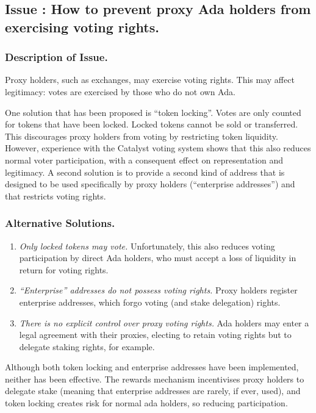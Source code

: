 \subsection*{Issue \theissue{}: How to prevent proxy Ada holders from exercising voting rights.}

\subsubsection*{Description of Issue.}

Proxy holders, such as exchanges, may exercise voting rights.  This may affect legitimacy: votes are exercised by those who do not own Ada.

One solution that has been proposed is ``token locking''.  Votes are
only counted for tokens that have been locked.  Locked tokens cannot
be sold or transferred.  This discourages proxy holders from voting by
restricting token liquidity.  However, experience with the Catalyst
voting system shows that this also reduces normal voter participation,
with a consequent effect on representation and
legitimacy. 
A second solution is to provide a second kind of address that is designed to be used specifically by proxy holders (``enterprise addresses'')
and that restricts voting rights.

\subsubsection*{Alternative Solutions.}

\begin{enumerate}
\item
  \emph{Only locked tokens may vote.}  Unfortunately, this also reduces voting participation by direct Ada holders, who must accept a loss of liquidity in return for voting rights.
\item
  \emph{``Enterprise'' addresses do not possess voting rights.}  Proxy holders register enterprise addresses, which forgo voting (and stake delegation) rights.
\item
  \emph{There is no explicit control over proxy voting rights.}  Ada holders may enter a legal agreement with their proxies, electing to retain voting
  rights but to delegate staking rights, for example.  
\end{enumerate}

Although both token locking and enterprise addresses have been implemented, neither has been effective.
The rewards mechanism incentivises proxy holders to delegate stake (meaning that enterprise addresses are rarely, if ever, used),
and token locking creates risk for normal ada holders, so reducing participation.


